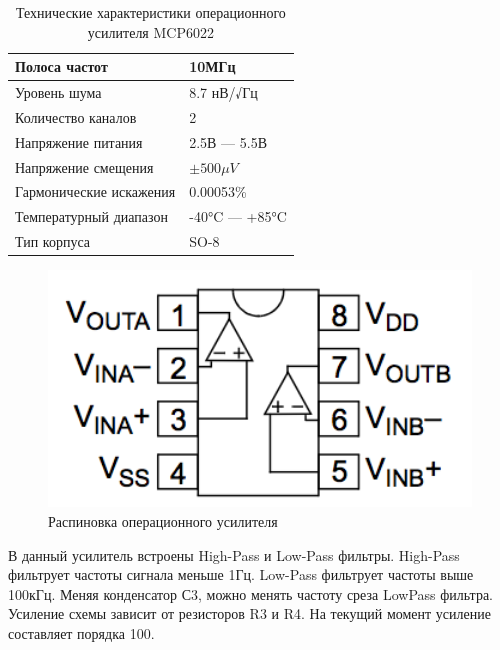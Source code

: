 \documentclass[../paper.tex]{subfiles}
\begin{document}
\begin{table}[h]
\centering
\caption{Технические характеристики операционного усилителя MCP6022}
\begin{tabular}{|l|l|}
\hline
Полоса частот                  & 10МГц                      \\ \hline
Уровень шума                   & 8.7 нВ/√Гц                 \\ \hline
Количество каналов             & 2                          \\ \hline
Напряжение питания             & 2.5В --- 5.5В              \\ \hline
Напряжение смещения            & $\pm500\mu V $             \\ \hline
Гармонические искажения        & 0.00053\%                  \\ \hline
Температурный диапазон         & -40°C --- +85°C            \\ \hline
Тип корпуса                    & SO-8                       \\ \hline
\end{tabular}
\end{table}

\begin{figure}[H]
\centering
\includegraphics[width=16cm]{images/op-amp.png}
\caption{Распиновка операционного усилителя}
\end{figure}

В данный усилитель встроены High-Pass и Low-Pass фильтры. High-Pass фильтрует частоты сигнала меньше 1Гц. Low-Pass фильтрует частоты выше 100кГц. Меняя конденсатор С3, можно менять частоту среза LowPass фильтра. Усиление схемы зависит от резисторов R3 и R4. На текущий момент усиление составляет порядка 100.
\end{document}

